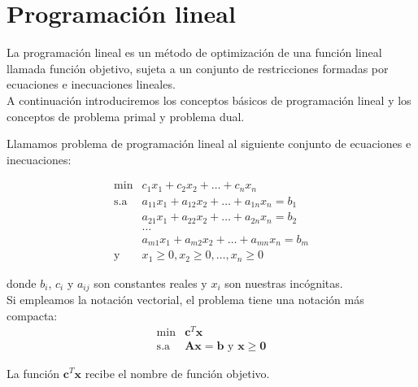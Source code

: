 \chapter{Programación lineal}

La programación lineal es un método de optimización de una función lineal llamada función objetivo, sujeta a un conjunto de restricciones formadas por ecuaciones e inecuaciones lineales.  \\

A continuación introduciremos los conceptos básicos de programación lineal y los conceptos de problema primal y problema dual.

\begin{defi}
Llamamos problema de programación lineal al siguiente conjunto de ecuaciones e inecuaciones:

\begin{equation}\label{eq:lineal}
\begin{array}{rl}
\mathrm{min} & c_1x_1 + c_2x_2 + \dots + c_nx_n\\
\mathrm{s.a} & a_{11}x_1 + a_{12}x_2 + \dots + a_{1n}x_n = b_1\\
             & a_{21}x_1 + a_{22}x_2 + \dots + a_{2n}x_n = b_2\\
             & \dots                                          \\
             & a_{m1}x_1 + a_{m2}x_2 + \dots + a_{mn}x_n = b_m\\
\text{y}     & x_1 \geq 0, x_2 \geq 0, \dots, x_n \geq 0
\end{array}
\end{equation}

donde $b_i$, $c_i$ y $a_{ij}$ son constantes reales y $x_i$ son nuestras incógnitas.\\

Si empleamos la notación vectorial, el problema tiene una notación más compacta:\\

\begin{equation} \label{eq:forma_normal}
\begin{array}{rl}
\mathrm{min} & \mathbf{c}^T \mathbf{x}\\
\mathrm{s.a} & \mathbf{A x} = \mathbf{b} \text{ y } \mathbf{x} \geq \mathbf{0}
\end{array}
\end{equation} 

\end{defi}

\begin{defi}
La función $\mathbf{c}^T \mathbf{x}$ recibe el nombre de función objetivo.
\end{defi}

